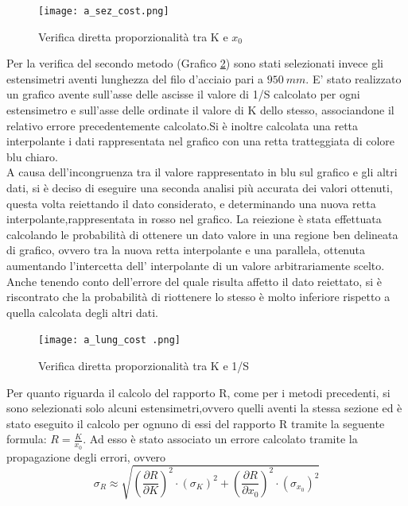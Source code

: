 \documentclass[a4paper,11pt,oneside]{article}
\begin{document}
\begin{figure}[h!]
    \centering

        \label{fig:a_sezione_cost}
        \texttt{[image: a\_sez\_cost.png]}
        \caption{Verifica diretta proporzionalità tra K e $x_0$}
        
\end{figure}
Per la verifica del secondo metodo (Grafico \ref{fig:a_lunghezza_cost}) sono stati selezionati invece gli estensimetri aventi lunghezza del filo d'acciaio pari a $\SI{950}{mm}$. E' stato realizzato un grafico avente sull'asse delle ascisse il valore di 1/S  calcolato per ogni estensimetro e sull'asse delle ordinate il valore di K dello stesso, associandone il relativo errore precedentemente calcolato.Si è inoltre calcolata una retta interpolante i dati rappresentata nel grafico con una retta tratteggiata di colore blu chiaro.\\
A causa dell'incongruenza tra il valore rappresentato in blu sul grafico e gli altri dati, si è deciso di eseguire una seconda analisi più accurata dei valori ottenuti, questa volta reiettando il dato considerato, e determinando una nuova retta interpolante,rappresentata in rosso nel grafico.
La reiezione è stata effettuata calcolando le probabilità di ottenere un dato valore in una regione ben delineata di grafico, ovvero tra la nuova retta interpolante e una parallela, ottenuta aumentando l'intercetta dell' interpolante di un valore arbitrariamente scelto. Anche tenendo conto dell'errore del quale risulta affetto il dato reiettato, si è riscontrato che la probabilità di riottenere lo stesso è molto inferiore rispetto a quella calcolata degli altri dati.


\begin{figure}[h!]
    \centering
    
        \label{fig:a_lunghezza_cost}
        \texttt{[image: a\_lung\_cost .png]}
        \caption{Verifica diretta proporzionalità tra K e 1/S}
\end{figure}



Per quanto riguarda il calcolo del rapporto R, come per i metodi precedenti, si sono selezionati solo alcuni estensimetri,ovvero quelli aventi la stessa sezione ed è stato eseguito il calcolo per ognuno di essi del rapporto R tramite la seguente formula: $R=\frac{K}{x_{0}}$. Ad esso è stato associato un errore calcolato tramite la propagazione degli errori, ovvero 
\begin{equation*}
    \sigma_R \approx \sqrt{\left ( \frac{\partial R }{\partial K} \right )^2 \cdot \left ( \sigma_K \right )^2 + \left ( \frac{\partial R }{\partial x_0} \right )^2 \cdot \left ( \sigma_{x_0} \right )^2 }
\end{equation*}
\end{document}
